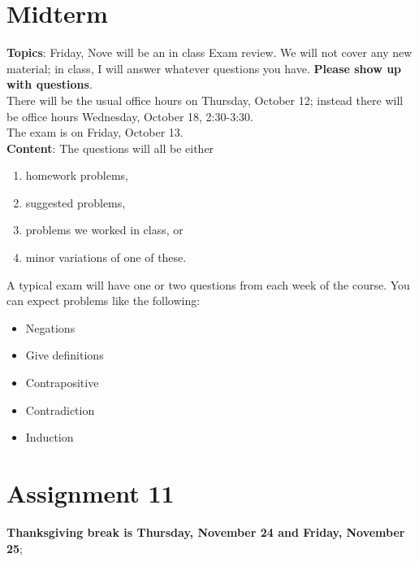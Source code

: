 \documentclass[12pt]{article}
\begin{document}
\section[ (November 17) Midterm]{Midterm}

\textbf{Topics}: Friday, Nove will be an in class Exam review. We will not cover any new material; in class, I will answer whatever questions you have. \textbf{Please show up with questions}.
\\
There will be the usual office hours on Thursday, October 12; instead there will be office hours Wednesday, October 18, 2:30-3:30.
\\

The exam is on Friday, October 13.
\\

\noindent \textbf{Content}: The questions will all be either
\begin{enumerate}
\item homework problems,
\item suggested problems,
\item problems we worked in class, or
\item minor variations of one of these.
\end{enumerate}


A typical exam will have one or two questions from each week of the course. You can expect problems like the following:
\begin{itemize}
\item Negations
\item Give definitions
\item Contrapositive  
\item Contradiction
\item Induction
\end{itemize}

 
\newpage
\section[11 (due \csname dateWeek11\endcsname): Inverse functions.]{Assignment 11}

\noindent \textbf{Thanksgiving break is Thursday, November 24 and Friday, November 25};
\end{document}
